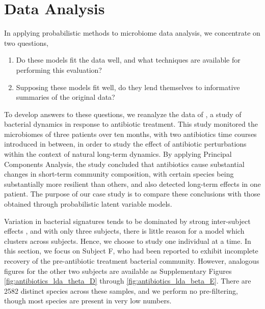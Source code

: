 \documentclass[oupdraft]{bio}
\begin{document}
\section{Data Analysis}
\label{sec:data_analysis}

In applying probabilistic methods to microbiome data analysis, we concentrate on
two questions,
\begin{enumerate}
\item Do these models fit the data well, and what techniques are available for
  performing this evaluation?
\item Supposing these models fit well, do they lend themselves to informative
  summaries of the original data?
\end{enumerate}

To develop answers to these questions, we reanalyze the data of
\cite{dethlefsen2011incomplete}, a study of bacterial dynamics in response to
antibiotic treatment. This study monitored the microbiomes of three patients
over ten months, with two antibiotics time courses introduced in between, in
order to study the effect of antibiotic perturbations within the context of
natural long-term dynamics. By applying Principal Components Analysis, the study
concluded that antibiotics cause substantial changes in short-term community
composition, with certain species being substantially more resilient than
others, and also detected long-term effects in one patient. The purpose of our
case study is to compare these conclusions with those obtained through
probabilistic latent variable models.

Variation in bacterial signatures tends to be dominated by strong inter-subject
effects \citep{eckburg2005diversity}, and with only three subjects, there is
little reason for a model which clusters across subjects. Hence, we choose to
study one individual at a time. In this section, we focus on Subject F, who had
been reported to exhibit incomplete recovery of the pre-antibiotic treatment
bacterial community. However, analogous figures for the other two subjects are
available as Supplementary Figures \ref{fig:antibiotics_lda_theta_D} through
\ref{fig:antibiotics_lda_beta_E}. There are 2582 distinct species across these
samples, and we perform no pre-filtering, though most species are present in
very low numbers.
\end{document}

